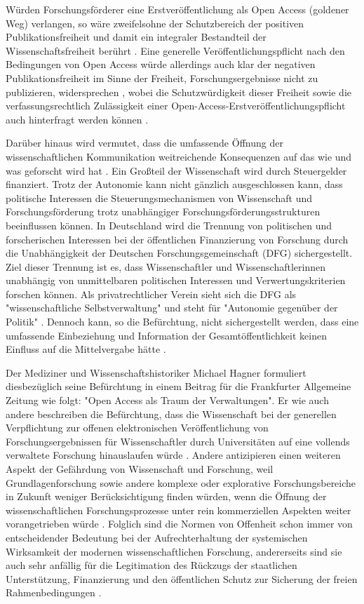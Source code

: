 Würden Forschungsförderer eine Erstveröffentlichung als Open Access (goldener Weg) verlangen, so wäre zweifelsohne der Schutzbereich der positiven Publikationsfreiheit und damit ein integraler Bestandteil der Wissenschaftsfreiheit berührt \cite[:191]{Fehling_2014} \cite{Peukert_2013}. Eine generelle Veröffentlichungspflicht nach den Bedingungen von Open Access würde allerdings auch klar der negativen Publikationsfreiheit im Sinne der Freiheit, Forschungsergebnisse nicht zu publizieren, widersprechen \cite[:192]{Fehling_2014}, wobei die Schutzwürdigkeit dieser Freiheit sowie die verfassungsrechtlich Zulässigkeit einer Open-Access-Erstveröffentlichungspflicht auch hinterfragt werden können \cite[:192]{Fehling_2014} \cite{Peukert_2013}.

Darüber hinaus wird vermutet, dass die umfassende Öffnung der wissenschaftlichen Kommunikation weitreichende Konsequenzen auf das wie und was geforscht wird hat \cite{Szczesny_2014} \cite{Weingart_2005}. Ein Großteil der Wissenschaft wird durch Steuergelder finanziert. Trotz der Autonomie kann nicht gänzlich ausgeschlossen kann, dass politische Interessen die Steuerungsmechanismen von Wissenschaft und Forschungsförderung trotz unabhängiger Forschungsförderungsstrukturen beeinflussen können. In Deutschland wird die Trennung von politischen und forscherischen Interessen bei der öffentlichen Finanzierung von Forschung durch die Unabhängigkeit der Deutschen Forschungsgemeinschaft (DFG) sichergestellt. Ziel dieser Trennung ist es, dass Wissenschaftler und Wissenschaftlerinnen unabhängig von unmittelbaren politischen Interessen und Verwertungskriterien forschen können. Als privatrechtlicher Verein sieht sich die DFG als "wissenschaftliche Selbstverwaltung" und steht für "Autonomie gegenüber der Politik" \cite{DFG_2011}. Dennoch kann, so die Befürchtung, nicht sichergestellt werden, dass eine umfassende Einbeziehung und Information der Gesamtöffentlichkeit keinen Einfluss auf die Mittelvergabe hätte \cite{Weingart_2005}.

Der Mediziner und Wissenschaftshistoriker Michael Hagner formuliert diesbezüglich seine Befürchtung in einem Beitrag für die Frankfurter Allgemeine Zeitung wie folgt: "Open Access als Traum der Verwaltungen". Er wie auch andere beschreiben die Befürchtung, dass die Wissenschaft bei der generellen Verpflichtung zur offenen elektronischen Veröffentlichung von Forschungsergebnissen für Wissenschaftler durch Universitäten auf eine vollends verwaltete Forschung hinauslaufen würde \cite{Hagner_2009}. Andere antizipieren einen weiteren Aspekt der Gefährdung von Wissenschaft und Forschung, weil Grundlagenforschung sowie andere komplexe oder explorative Forschungsbereiche in Zukunft weniger Berücksichtigung finden würden, wenn die Öffnung der wissenschaftlichen Forschungsprozesse unter rein kommerziellen Aspekten weiter vorangetrieben würde \cite{Szczesny_2014}. Folglich sind die Normen von Offenheit schon immer von entscheidender Bedeutung bei der Aufrechterhaltung der systemischen Wirksamkeit der modernen wissenschaftlichen Forschung, andererseits sind sie auch sehr anfällig für die Legitimation des Rückzugs der staatlichen Unterstützung, Finanzierung und den öffentlichen Schutz zur Sicherung der freien Rahmenbedingungen \cite{David_1998}.

